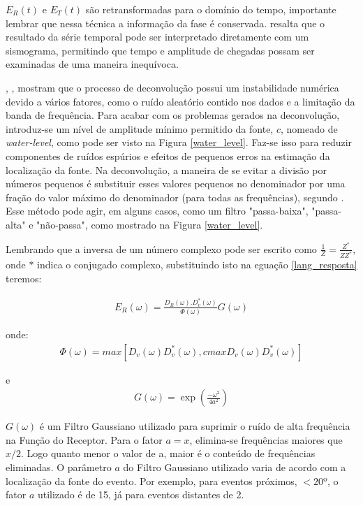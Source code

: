 $E_{R}(t)$ e $E_{T}(t)$ são retransformadas para o domínio do tempo, importante lembrar que nessa técnica a informação da fase é conservada. \cite{langston_structure_1979} resalta que o resultado da série temporal pode ser interpretado diretamente com um sismograma, permitindo que tempo e amplitude de chegadas possam ser examinadas de uma maneira inequívoca.

\cite{clayton_source_1976}, \cite{langston_structure_1979}, \cite{ligorria_iterative_1999} mostram que o processo de deconvolução possui um instabilidade numérica devido a vários fatores, como o ruído aleatório contido nos dados e a limitação da banda de frequência. Para acabar com os problemas gerados na deconvolução, \cite{clayton_source_1976} introduz-se um nível de amplitude mínimo permitido da fonte, $c$, nomeado de \textit{water-level}, como pode ser visto na Figura \ref{water_level}. Faz-se isso para reduzir componentes de ruídos espúrios e efeitos de pequenos erros na estimação da localização da fonte. Na deconvolução, a maneira de se evitar a divisão por números pequenos é substituir esses valores pequenos no denominador por uma fração do valor máximo do denominador (para todas as frequências), segundo \cite{Ammon_waterlevel_1997}. Esse método pode agir, em alguns casos, como um filtro "passa-baixa", "passa-alta" e "não-passa", como mostrado na Figura \ref{water_level}. 

Lembrando que a inversa de um número complexo pode ser escrito como $\frac{1}{Z} = \frac{Z^{*}}{ZZ^{*}}$, onde $*$ indica o conjugado complexo, substituindo isto na eguação \ref{lang_resposta} teremos:

\begin{eqnarray}
E_{R}(\omega) =  \frac{D_{R}(\omega).D^{*}_{v}(\omega)}{\Phi(\omega)}G(\omega)
\end{eqnarray}

onde:
\begin{eqnarray} \nonumber
\Phi(\omega) = max[D_{v}(\omega)D^{*}_{v}(\omega),cmax{D_{v}(\omega)D^{*}_{v}(\omega)}] 
\end{eqnarray}

e
\begin{eqnarray} \nonumber
G(\omega) = \exp(\frac{-\omega ^{2}}{4a^{2}})
\end{eqnarray}

$G(\omega)$ é um Filtro Gaussiano utilizado para suprimir o ruído de alta frequência na Função do Receptor. Para o fator $a = x$, elimina-se frequências maiores que $x/2$. Logo quanto menor o valor de a, maior é o conteúdo de frequências eliminadas. O parâmetro $a$ do Filtro Gaussiano utilizado varia de acordo com a localização da fonte do evento. Por exemplo, para eventos próximos, $<20º$, o fator $a$ utilizado é  de 15, já para eventos distantes de 2.

